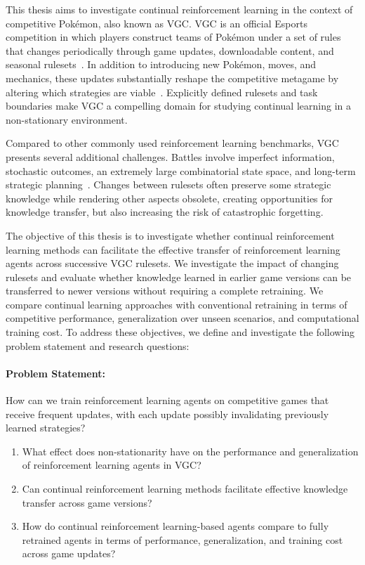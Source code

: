 This thesis aims to investigate continual reinforcement learning in the context of competitive Pokémon, also known as VGC.
VGC is an official Esports competition in which players construct teams of Pokémon under a set of rules that changes periodically through game updates, downloadable content, and seasonal rulesets~\cite{angliss2025vgc,vgc-rules-regulations}.
In addition to introducing new Pokémon, moves, and mechanics, these updates substantially reshape the competitive metagame by altering which strategies are viable~\cite{angliss2025vgc}.
Explicitly defined rulesets and task boundaries make VGC a compelling domain for studying continual learning in a non-stationary environment.

Compared to other commonly used reinforcement learning benchmarks, VGC presents several additional challenges.
Battles involve imperfect information, stochastic outcomes, an extremely large combinatorial state space, and long-term strategic planning~\cite{angliss2025vgc}.
Changes between rulesets often preserve some strategic knowledge while rendering other aspects obsolete, creating opportunities for knowledge transfer, but also increasing the risk of catastrophic forgetting.

The objective of this thesis is to investigate whether continual reinforcement learning methods can facilitate the effective transfer of reinforcement learning agents across successive VGC rulesets.
We investigate the impact of changing rulesets and evaluate whether knowledge learned in earlier game versions can be transferred to newer versions without requiring a complete retraining.
We compare continual learning approaches with conventional retraining in terms of competitive performance, generalization over unseen scenarios, and computational training cost.
To address these objectives, we define and investigate the following problem statement and research questions:

\paragraph{Problem Statement:} How can we train reinforcement learning agents on competitive games that receive frequent updates, with each update possibly invalidating previously learned strategies?

\begin{enumerate}[leftmargin=3em]
    \item[\textbf{RQ1:}] What effect does non-stationarity have on the performance and generalization of reinforcement learning agents in VGC?
    \item[\textbf{RQ2:}] Can continual reinforcement learning methods facilitate effective knowledge transfer across game versions?
    \item[\textbf{RQ3:}] How do continual reinforcement learning-based agents compare to fully retrained agents in terms of performance, generalization, and training cost across game updates?
\end{enumerate}

